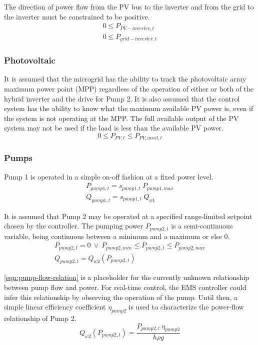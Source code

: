 The direction of power flow from the PV bus to the inverter and from the grid to the inverter must be constrained to be positive.
%
\begin{gather}
\label{eqn:pv-inverter-positive}
0 \le P_{PV-inverter,t} \\
\label{eqn:grid-inverter-positive}
0 \le P_{grid-inverter,t}
\end{gather}

\subsubsection{Photovoltaic}

It is assumed that the microgrid has the ability to track the photovoltaic array maximum power point (MPP) regardless of the operation of either or both of the hybrid inverter and the drive for Pump 2. It is also assumed that the control system has the ability to know what the maximum available PV power is, even if the system is not operating at the MPP. The full available output of the PV system may not be used if the load is less than the available PV power.
%
\begin{equation}
\label{eqn:pv-limit}
0 \le P_{PV,t} \le P_{PV,avail,t}
\end{equation}

\subsubsection{Pumps}

Pump 1 is operated in a simple on-off fashion at a fixed power level.
%
\begin{gather}
\label{eqn:pump1-power}
P_{pump1,t} = s_{pump1,t} \ P_{pump1,max} \\
\label{eqn:pump1-flow}
Q_{pump1,t} = s_{pump1,t} \ Q_{w1}
\end{gather}

It is assumed that Pump 2 may be operated at a specified range-limited setpoint chosen by the controller. The pumping power $P_{pump2,t}$ is a semi-continuous variable, being continuous between a minimum and a maximum or else 0.
%
\begin{gather}
\label{eqn:pump2-power}
P_{pump2,t} = 0 \ \lor \ P_{pump2,min} \le P_{pump2,t} \le P_{pump2,max} \\
\label{eqn:pump2-flow}
Q_{pump2,t} = Q_{w2}\left( P_{pump2,t} \right)
\end{gather}

\autoref{eqn:pump-flow-relation} is a placeholder for the currently unknown relationship between pump flow and power. For real-time control, the EMS controller could infer this relationship by observing the operation of the pump. Until then, a simple linear efficiency coefficient $\eta_{pump2}$ is used to characterize the power-flow relationship of Pump 2.
%
\begin{equation}
\label{eqn:pump-flow-relation}
 Q_{w2}\left( P_{pump2,t} \right) = \frac{P_{pump2,t} \ \eta_{pump2}}{h \rho g}
\end{equation}

